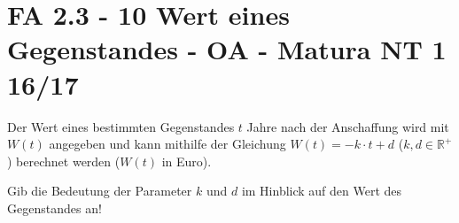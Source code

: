 \section{FA 2.3 - 10 Wert eines Gegenstandes - OA - Matura NT 1 16/17}

\begin{beispiel}[FA 2.3]{1} %
Der Wert eines bestimmten Gegenstandes $t$ Jahre nach der Anschaffung wird mit $W(t)$ angegeben und kann mithilfe der Gleichung $W(t)=-k\cdot t+d$ ($k,d\in\mathbb{R}^+$) berechnet werden ($W(t)$ in Euro).

Gib die Bedeutung der Parameter $k$ und $d$ im Hinblick auf den Wert des Gegenstandes an!

\end{beispiel}